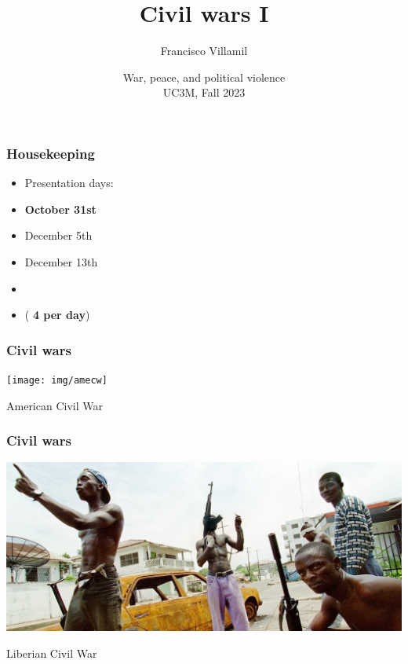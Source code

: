 \documentclass[aspectratio=43]{beamer}
\title{\huge Civil wars I}
\author{Francisco Villamil}
\date{War, peace, and political violence\\UC3M, Fall 2023}
\begin{document}
\begin{frame}
  \titlepage
\end{frame}

\begin{frame}
\frametitle{Housekeeping}
\centering

\begin{itemize}
  \item[] Presentation days:
  \item \textbf{October 31st}
  \item December 5th
  \item December 13th
  \item[]
  \item (\textbf{ 4 per day})
\end{itemize}


\end{frame}
  


\begin{frame}
\frametitle{Civil wars}
\centering

\texttt{[image: img/amecw]}

American Civil War

\end{frame}

\begin{frame}
\frametitle{Civil wars}
\centering

\includegraphics[width = \textwidth]{img/liberia}

Liberian Civil War

\end{frame}
\end{document}
